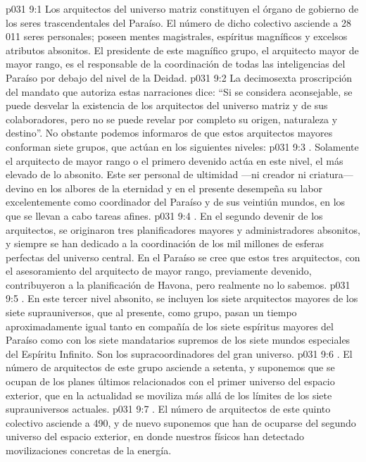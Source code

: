 \vs p031 9:1 Los arquitectos del universo matriz constituyen el órgano de gobierno de los seres trascendentales del Paraíso. El número de dicho colectivo asciende a 28\,011 seres personales; poseen mentes magistrales, espíritus magníficos y excelsos atributos absonitos. El presidente de este magnífico grupo, el arquitecto mayor de mayor rango, es el responsable de la coordinación de todas las inteligencias del Paraíso por debajo del nivel de la Deidad.
\vs p031 9:2 La decimosexta proscripción del mandato que autoriza estas narraciones dice: “Si se considera aconsejable, se puede desvelar la existencia de los arquitectos del universo matriz y de sus colaboradores, pero no se puede revelar por completo su origen, naturaleza y destino”. No obstante podemos informaros de que estos arquitectos mayores conforman siete grupos, que actúan en los siguientes niveles:
\vs p031 9:3 . Solamente el arquitecto de mayor rango o el primero devenido actúa en este nivel, el más elevado de lo absonito. Este ser personal de ultimidad ---ni creador ni criatura--- devino en los albores de la eternidad y en el presente desempeña su labor excelentemente como coordinador del Paraíso y de sus veintiún mundos, en los que se llevan a cabo tareas afines.
\vs p031 9:4 . En el segundo devenir de los arquitectos, se originaron tres planificadores mayores y administradores absonitos, y siempre se han dedicado a la coordinación de los mil millones de esferas perfectas del universo central. En el Paraíso se cree que estos tres arquitectos, con el asesoramiento del arquitecto de mayor rango, previamente devenido, contribuyeron a la planificación de Havona, pero realmente no lo sabemos.
\vs p031 9:5 . En este tercer nivel absonito, se incluyen los siete arquitectos mayores de los siete suprauniversos, que al presente, como grupo, pasan un tiempo aproximadamente igual tanto en compañía de los siete espíritus mayores del Paraíso como con los siete mandatarios supremos de los siete mundos especiales del Espíritu Infinito. Son los supracoordinadores del gran universo.
\vs p031 9:6 . El número de arquitectos de este grupo asciende a setenta, y suponemos que se ocupan de los planes últimos relacionados con el primer universo del espacio exterior, que en la actualidad se moviliza más allá de los límites de los siete suprauniversos actuales.
\vs p031 9:7 . El número de arquitectos de este quinto colectivo asciende a 490, y de nuevo suponemos que han de ocuparse del segundo universo del espacio exterior, en donde nuestros físicos han detectado movilizaciones concretas de la energía.
